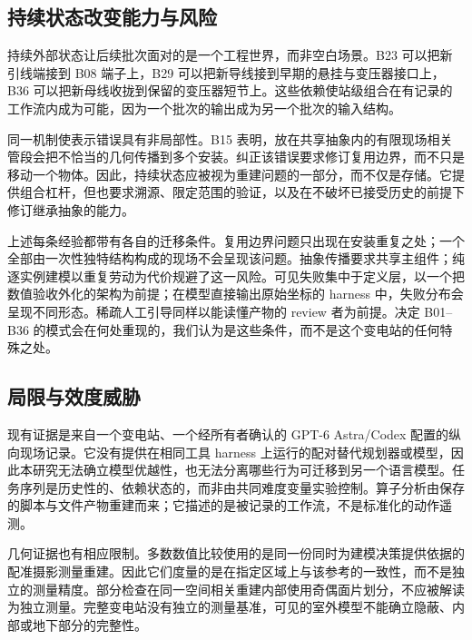 \documentclass[10pt,a4paper]{article}
\begin{document}
\hypertarget{ux6301ux7eedux72b6ux6001ux6539ux53d8ux80fdux529bux4e0eux98ceux9669}{%
\subsection{持续状态改变能力与风险}\label{ux6301ux7eedux72b6ux6001ux6539ux53d8ux80fdux529bux4e0eux98ceux9669}}

持续外部状态让后续批次面对的是一个工程世界，而非空白场景。B23
可以把新引线端接到 B08 端子上，B29
可以把新导线接到早期的悬挂与变压器接口上，B36
可以把新母线收拢到保留的变压器短节上。这些依赖使站级组合在有记录的工作流内成为可能，因为一个批次的输出成为另一个批次的输入结构。

同一机制使表示错误具有非局部性。B15
表明，放在共享抽象内的有限现场相关管段会把不恰当的几何传播到多个安装。纠正该错误要求修订复用边界，而不只是移动一个物体。因此，持续状态应被视为重建问题的一部分，而不仅是存储。它提供组合杠杆，但也要求溯源、限定范围的验证，以及在不破坏已接受历史的前提下修订继承抽象的能力。

上述每条经验都带有各自的迁移条件。复用边界问题只出现在安装重复之处；一个全部由一次性独特结构构成的现场不会呈现该问题。抽象传播要求共享主组件；纯逐实例建模以重复劳动为代价规避了这一风险。可见失败集中于定义层，以一个把数值验收外化的架构为前提；在模型直接输出原始坐标的
harness 中，失败分布会呈现不同形态。稀疏人工引导同样以能读懂产物的
review 者为前提。决定 B01--B36
的模式会在何处重现的，我们认为是这些条件，而不是这个变电站的任何特殊之处。

\hypertarget{ux5c40ux9650ux4e0eux6548ux5ea6ux5a01ux80c1}{%
\subsection{局限与效度威胁}\label{ux5c40ux9650ux4e0eux6548ux5ea6ux5a01ux80c1}}

现有证据是来自一个变电站、一个经所有者确认的 GPT-6 Astra/Codex
配置的纵向现场记录。它没有提供在相同工具 harness
上运行的配对替代规划器或模型，因此本研究无法确立模型优越性，也无法分离哪些行为可迁移到另一个语言模型。任务序列是历史性的、依赖状态的，而非由共同难度变量实验控制。算子分析由保存的脚本与文件产物重建而来；它描述的是被记录的工作流，不是标准化的动作遥测。

几何证据也有相应限制。多数数值比较使用的是同一份同时为建模决策提供依据的配准摄影测量重建。因此它们度量的是在指定区域上与该参考的一致性，而不是独立的测量精度。部分检查在同一空间相关重建内部使用奇偶面片划分，不应被解读为独立测量。完整变电站没有独立的测量基准，可见的室外模型不能确立隐蔽、内部或地下部分的完整性。
\end{document}
